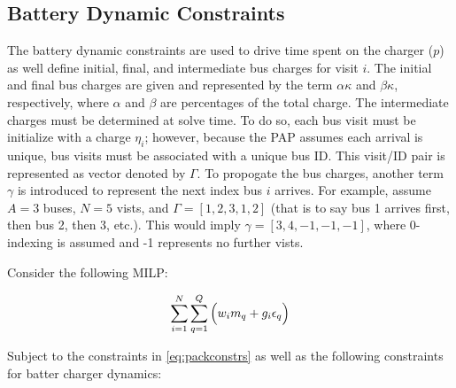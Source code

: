 \documentclass[letterpaper, 10pt, conference]{IEEEtran}
\begin{document}
\subsection{Battery Dynamic Constraints}
The battery dynamic constraints are used to drive time spent on the charger (\(p\)) as well define initial, final, and intermediate bus charges for visit \(i\). The initial and final bus charges are given and represented by the term \(\alpha \kappa\) and \(\beta \kappa\), respectively, where \(\alpha\) and \(\beta\) are percentages of the total charge. The intermediate charges must be determined at solve time. To do so, each bus visit must be initialize with a charge \(\eta_i\); however, because the PAP assumes each arrival is unique, bus visits must be associated with a unique bus ID. This visit/ID pair is represented as vector denoted by \(\Gamma\). To propogate the bus charges, another term \(\gamma\) is introduced to represent the next index bus \(i\) arrives. For example, assume \(A = 3\) buses, \(N = 5\) vists, and \(\Gamma = [1,2,3,1,2]\) (that is to say bus 1 arrives first, then bus 2, then 3, etc.). This would imply \(\gamma = [3,4,-1,-1,-1]\), where 0-indexing is assumed and -1 represents no further vists.

Consider the following MILP:

\begin{equation}
\label{eq:objective}
    \sum_{i=1}^N \sum_{q=1}^Q \Big( w_i m_q + g_i \epsilon_q \Big) \\
\end{equation}

Subject to the constraints in \eqref{eq:packconstrs} as well as the following constraints for batter charger dynamics:
\end{document}
